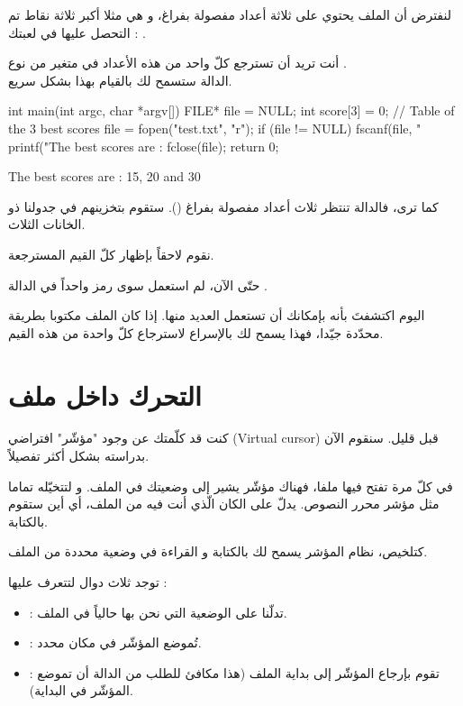 لنفترض أن الملف يحتوي على ثلاثة أعداد مفصولة بفراغ، و هي مثلا أكبر ثلاثة نقاط تم التحصل عليها في لعبتك :
.

أنت تريد أن تسترجع كلّ واحد من هذه الأعداد في متغير من نوع
.\\
الدالة
ستسمح لك بالقيام بهذا بشكل سريع.

\begin{Csource}
int main(int argc, char *argv[])
{
  FILE* file = NULL;
  int score[3] = {0}; // Table of the 3 best scores
  file = fopen("test.txt", "r");
  if (file != NULL)
  {
    fscanf(file, "%
    printf("The best scores are : %
    fclose(file);
  }
  return 0;
}
\end{Csource}

\begin{Console}
The best scores are : 15, 20 and 30
\end{Console}

كما ترى، فالدالة
تنتظر ثلاث أعداد مفصولة بفراغ
().
ستقوم بتخزينهم في جدولنا ذو الخانات الثلاث.

نقوم لاحقاً بإظهار كلّ القيم المسترجعة.

\begin{information}
حتّى الآن، لم استعمل سوى رمز
واحداً في الدالة
.

اليوم اكتشفتَ بأنه بإمكانك أن تستعمل العديد منها. إذا كان الملف مكتوبا بطريقة محدّدة جيّدا، فهذا يسمح لك بالإسراع لاسترجاع كلّ واحدة من هذه القيم.
\end{information}

\section{التحرك داخل ملف}

كنت قد كلّمتك عن وجود "مؤشّر" افتراضي
(\textenglish{Virtual cursor})
قبل قليل.
سنقوم الآن بدراسته بشكل أكثر تفصيلاً.

في كلّ مرة تفتح فيها ملفا، فهناك مؤشّر يشير إلى وضعيتك في الملف. و لتتخيّله تماما مثل مؤشر محرر النصوص. يدلّ على الكان الّذي أنت فيه من الملف، أي أين ستقوم بالكتابة.

كتلخيص، نظام المؤشر يسمح لك بالكتابة و القراءة في وضعية محددة من الملف.

توجد ثلاث دوال لتتعرف عليها :

\begin{itemize}
  \item {} :
  تدلّنا على الوضعية التي نحن بها حالياً في الملف.
  \item {} :
  تُموضع المؤشّر في مكان محدد.
  \item {} :
  تقوم بإرجاع المؤشّر إلى بداية الملف (هذا مكافئ للطلب من الدالة
  أن تموضع المؤشّر في البداية).
\end{itemize}

